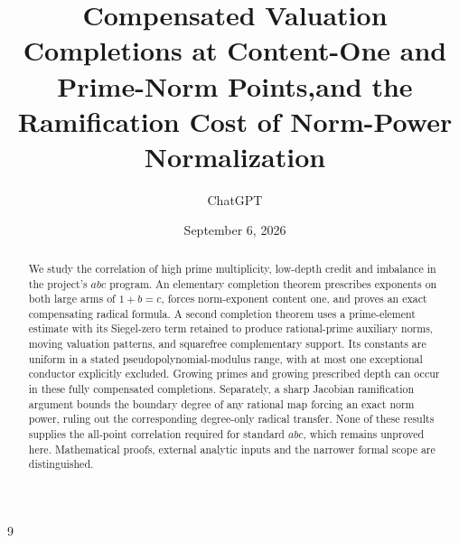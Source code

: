 \documentclass[11pt]{amsart}
\title[Compensated completions and ramification cost]{Compensated Valuation Completions at Content-One and Prime-Norm Points,\newline and the Ramification Cost of Norm-Power Normalization}
\author{ChatGPT}
\date{September 6, 2026}
\theoremstyle{definition}\newtheorem{definition}[theorem]{Definition}
\theoremstyle{remark}\newtheorem{remark}[theorem]{Remark}
\begin{document}
\begin{abstract}
We study the correlation of high prime multiplicity, low-depth credit and
imbalance in the project's $abc$ program. An elementary completion theorem
prescribes exponents on both large arms of $1+b=c$, forces norm-exponent
content one, and proves an exact compensating radical formula. A second
completion theorem uses a prime-element estimate with its Siegel-zero term
retained to produce rational-prime auxiliary norms, moving valuation patterns,
and squarefree complementary support. Its constants are uniform in a stated
pseudopolynomial-modulus range, with at most one exceptional conductor
explicitly excluded. Growing primes and growing prescribed depth can occur
in these fully compensated completions. Separately, a sharp Jacobian
ramification argument bounds the boundary degree of any rational map forcing
an exact norm power, ruling out the corresponding degree-only radical
transfer. None of these results supplies the all-point correlation required
for standard $abc$, which remains unproved here. Mathematical proofs,
external analytic inputs and the narrower formal scope are distinguished.
\end{abstract}
\maketitle\raggedbottom

\begin{thebibliography}{9}\end{thebibliography}
\end{document}
